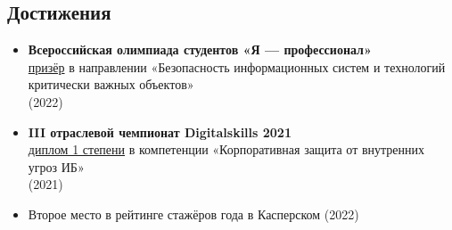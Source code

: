 \documentclass[12pt, a4paper]{extarticle}
\begin{document}
\subsection*{Достижения}
\small
\begin{itemize}
    \item {\bf Всероссийская олимпиада студентов «Я — профессионал»} \\
    \href{https://drive.google.com/file/d/1m03jSHaAR2LvP1NXdzZBnVJ_jEoJGz5P/view?usp=sharing}{призёр} в направлении «Безопасность информационных систем и технологий критически важных объектов» \\
    (2022)
    \item {\bf III отраслевой чемпионат Digitalskills 2021} \\
    \href{https://drive.google.com/file/d/1ghvxSiuflWyP6pI33bKbf_N1M8ZIhiTY/view?usp=sharing}{диплом 1 степени} в компетенции «Корпоративная защита от внутренних угроз ИБ» \\
    (2021)
    \item Второе место в рейтинге стажёров года в Касперском (2022)
\end{itemize}
\end{document}
